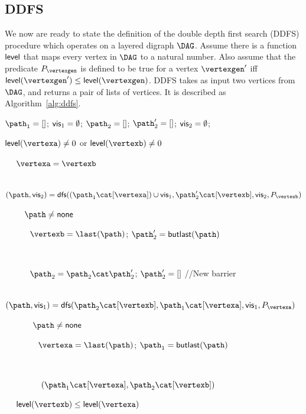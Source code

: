 \subsection{DDFS}

We now are ready to state the definition of the double depth first search (DDFS) procedure which operates on a layered digraph $\DAG$.
Assume there is a function $\textsf{\upshape level}$ that maps every vertex in $\digraph$ to a natural number.
Also assume that the predicate $\Plevel{\vertexgen}$ is defined to be true for a vertex $\vertexgen'$ iff $\level(\vertexgen') \leq \level(\vertexgen)$.
DDFS takes as input two vertices from $\digraph$, and returns a pair of lists of vertices.
It is described as Algorithm~\ref{alg:ddfs}.
{
\begin{algorithm}\DontPrintSemicolon
  \begin{enumerate}
  \item $\patha=[]$; $\textsf{\upshape vis}_1 = \emptyset$; $\pathb=[]$; $\pathb'=[]$; $\textsf{\upshape vis}_2 = \emptyset$;\;
  \item {} $\level(\vertexa) \neq 0$ or $\level(\vertexb) \neq 0$\;
  \item \ \  $\vertexa = \vertexb$\;
  \item {\label{step:dfscall1}
        \ \ \ \ $(\path,\visb) = \dfs((\patha\cat[\vertexa])\cup\visa, \pathb'\cat[\vertexb], \visb, \Plevel{\vertexb})$\;}
  \item \ \ \ \  $\path \neq \none$\;
  \item {\label{step:newitr1}
        \ \ \ \ \ \ $\vertexb=\last(\path)$; $\pathb'=\butlast(\path)$\;}
  \item \ \ \ \ \;
  \item \ \ \ \ \ \ $\pathb=\pathb\cat\pathb'$; $\pathb'=[]$ //New barrier\;
  \item \ \ \ \ \ \ $(\path,\visa) = \dfs(\pathb\cat[\vertexb], \patha\cat[\vertexa],\visa, \Plevel{\vertexa})$\;
  \item \ \ \ \ \ \  $\path \neq \none$\;
        {\label{step:newitr2}
  \item \ \ \ \ \ \ \ \ $\vertexa=\last(\path)$; $\patha=\butlast(\path)$\;}
  \item \ \ \ \ \ \ \;
  \item {\label{step:ret1}
        \ \ \ \ \ \ \ \  $(\patha\cat[\vertexa], \pathb\cat[\vertexb])$}\;
  \item \ \   $\level(\vertexb) \leq \level(\vertexa)$\;

\end{enumerate}
\end{algorithm}}
